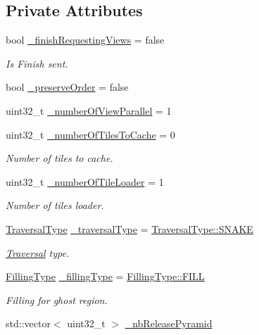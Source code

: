 \subsection*{Private Attributes}
\begin{DoxyCompactItemize}
\item 
bool \hyperlink{classfi_1_1FastImage_1_1Options_a1a0a6ab982226db16e8cddd79f7aafcb}{\+\_\+finish\+Requesting\+Views} = false
\begin{DoxyCompactList}\small\item\em Is Finish sent. \end{DoxyCompactList}\item 
bool \hyperlink{classfi_1_1FastImage_1_1Options_a89246137a00324e27b14d360801aa00e}{\+\_\+preserve\+Order} = false
\item 
uint32\+\_\+t \hyperlink{classfi_1_1FastImage_1_1Options_abb0ed640f08787dbecd751a6fb1d6e09}{\+\_\+number\+Of\+View\+Parallel} = 1
\item 
uint32\+\_\+t \hyperlink{classfi_1_1FastImage_1_1Options_aef0e0a6059bf90291ed2d869a10bb9bc}{\+\_\+number\+Of\+Tiles\+To\+Cache} = 0
\begin{DoxyCompactList}\small\item\em Number of tiles to cache. \end{DoxyCompactList}\item 
uint32\+\_\+t \hyperlink{classfi_1_1FastImage_1_1Options_a81d48dcf92eecad3be50468e742ce3e5}{\+\_\+number\+Of\+Tile\+Loader} = 1
\begin{DoxyCompactList}\small\item\em Number of tiles loader. \end{DoxyCompactList}\item 
\hyperlink{namespacefi_a7ba5ce68668e7f273b22e5f56ca6dfcb}{Traversal\+Type} \hyperlink{classfi_1_1FastImage_1_1Options_a638ea5d61b431c5f6e58d06e9038d00f}{\+\_\+traversal\+Type} = \hyperlink{namespacefi_a7ba5ce68668e7f273b22e5f56ca6dfcba6a30da74d0b15b45ec14072c93b6645d}{Traversal\+Type\+::\+S\+N\+A\+KE}
\begin{DoxyCompactList}\small\item\em \hyperlink{classfi_1_1Traversal}{Traversal} type. \end{DoxyCompactList}\item 
\hyperlink{namespacefi_a6808b618c85d179a330ca388162215bd}{Filling\+Type} \hyperlink{classfi_1_1FastImage_1_1Options_acb814a9b2343a6d60ab40f46e37bebda}{\+\_\+filling\+Type} = \hyperlink{namespacefi_a6808b618c85d179a330ca388162215bdae8225b11842409df543692aebed34fd1}{Filling\+Type\+::\+F\+I\+LL}
\begin{DoxyCompactList}\small\item\em Filling for ghost region. \end{DoxyCompactList}\item 
std\+::vector$<$ uint32\+\_\+t $>$ \hyperlink{classfi_1_1FastImage_1_1Options_ab49c32b1b30543e864a059d710f8edf8}{\+\_\+nb\+Release\+Pyramid}
\end{DoxyCompactItemize}


